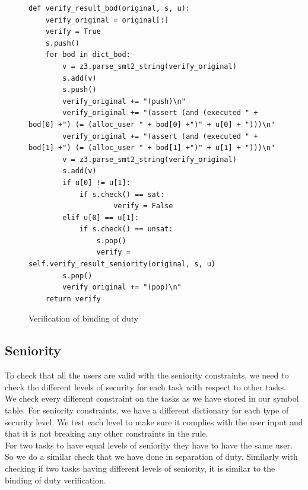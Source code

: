 \documentclass[a4paper]{report}
\begin{document}
\begin{figure}[!h]
\lstset{numbers=left, showspaces=false,
    showstringspaces=false, tabsize=2, breaklines=true,
    xleftmargin=5.0ex,
}
\begin{lstlisting}[frame=single]
def verify_result_bod(original, s, u):
	verify_original = original[:]
	verify = True
	s.push()
	for bod in dict_bod:
		v = z3.parse_smt2_string(verify_original)
		s.add(v)
		s.push()
		verify_original += "(push)\n"
		verify_original += "(assert (and (executed " + bod[0] +") (= (alloc_user " + bod[0] +")" + u[0] + ")))\n"
		verify_original += "(assert (and (executed " + bod[1] +") (= (alloc_user " + bod[1] +")" + u[1] + ")))\n"
		v = z3.parse_smt2_string(verify_original)
		s.add(v)
		if u[0] != u[1]:
			if s.check() == sat:
                    verify = False
		elif u[0] == u[1]:
			if s.check() == unsat:
				s.pop()
				verify = self.verify_result_seniority(original, s, u)
		s.pop()
		verify_original += "(pop)\n"
	return verify
\end{lstlisting}
\caption{Verification of binding of duty}
\label{fig:Verification of binding of duty}
\end{figure}

\newpage

\subsection{Seniority}
To check that all the users are valid with the seniority constraints, we need to check the different levels of security for each task with respect to other tasks. \\

We check every different constraint on the tasks as we have stored in our symbol table. For seniority constraints, we have a different dictionary for each type of security level. We test each level to make sure it complies with the user input and that it is not breaking any other constraints in the rule.\\

For two tasks to have equal levels of seniority they have to have the same user. So we do a similar check that we have done in separation of duty. Similarly with checking if two tasks having different levels of seniority, it is similar to the binding of duty verification. \\
\end{document}
